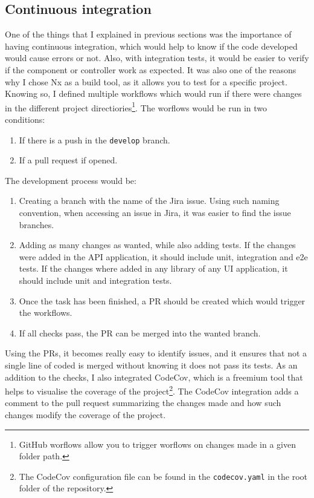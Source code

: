 \documentclass[a4paper, 12pt, oneside]{book}
\begin{document}
\subsection{Continuous integration}
One of the things that I explained in previous sections was the importance of having continuous integration, which would help to know if the code developed would cause errors or not. Also, with integration tests, it would be easier to verify if the component or controller work as expected. It was also one of the reasons why I chose Nx as a build tool, as it allows you to test for a specific project.
\\[8pt]
Knowing so, I defined multiple workflows \cite{github-workflows} which would run if there were changes in the different project directiories\footnote{GitHub worflows allow you to trigger worflows on changes made in a given folder path.}. The worflows would be run in two conditions:
\begin{enumerate}
	\item If there is a push in the \texttt{develop} branch.
	\item If a pull request if opened.
\end{enumerate}
The development process would be:
\begin{enumerate}
	\item Creating a branch with the name of the Jira issue. Using such naming convention, when accessing an issue in Jira, it was easier to find the issue branches.
	\item Adding as many changes as wanted, while also adding tests. If the changes were added in the API application, it should include unit, integration and e2e tests. If the changes where added in any library of any UI application, it should include unit and integration tests.
	\item Once the task has been finished, a PR should be created which would trigger the workflows.
	\item If all checks pass, the PR can be merged into the wanted branch.
\end{enumerate}
Using the PRs, it becomes really easy to identify issues, and it ensures that not a single line of coded is merged without knowing it does not pass its tests. As an addition to the checks, I also integrated CodeCov, which is a freemium tool that helps to visualise the coverage of the project\footnote{The CodeCov configuration file can be found in the \texttt{codecov.yaml} in the root folder of the repository.}. The CodeCov integration adds a comment to the pull request summarizing the changes made and how such changes modify the coverage of the project.
\end{document}
